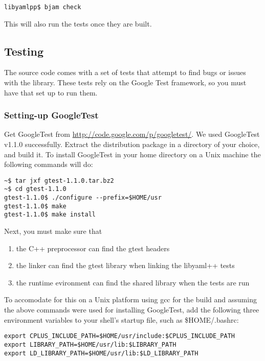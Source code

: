 \documentclass{article}
\begin{document}
\begin{verbatim}
libyamlpp$ bjam check
\end{verbatim}

This will also run the tests once they are built.

\subsection{Testing}

The source code comes with a set of tests that attempt to find bugs or issues
with the library.  These tests rely on the Google Test framework, so you must
have that set up to run them.

\subsubsection{Setting-up GoogleTest}

Get GoogleTest from \url{http://code.google.com/p/googletest/}.  We used GoogleTest
v1.1.0 successfully.  Extract the distribution package in a directory of your
choice, and build it.  To install GoogleTest in your home directory on a Unix
machine the following commands will do:

\begin{verbatim}
~$ tar jxf gtest-1.1.0.tar.bz2
~$ cd gtest-1.1.0
gtest-1.1.0$ ./configure --prefix=$HOME/usr
gtest-1.1.0$ make
gtest-1.1.0$ make install
\end{verbatim}

Next, you must make sure that

\begin{enumerate}
\item the C++ preprocessor can find the gtest headers
\item the linker can find the gtest library when linking the libyaml++ tests
\item the runtime evironment can find the shared library when the tests are run
\end{enumerate}

To accomodate for this on a Unix platform using gcc for the build and assuming
the above commands were used for installing GoogleTest, add the following three
environment variables to your shell's startup file, such as \$HOME/.bashrc:

\begin{verbatim}
export CPLUS_INCLUDE_PATH=$HOME/usr/include:$CPLUS_INCLUDE_PATH
export LIBRARY_PATH=$HOME/usr/lib:$LIBRARY_PATH
export LD_LIBRARY_PATH=$HOME/usr/lib:$LD_LIBRARY_PATH
\end{verbatim}
\end{document}
